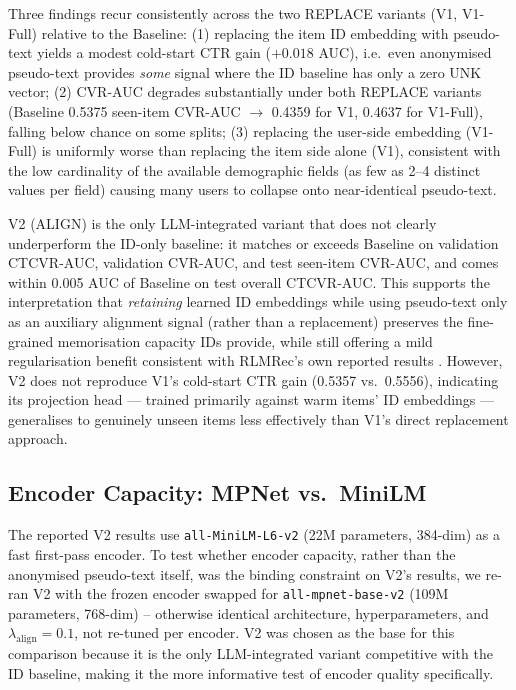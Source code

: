 Three findings recur consistently across the two REPLACE variants (V1, V1-Full) relative to the Baseline: (1) replacing the item ID embedding with pseudo-text yields a modest cold-start CTR gain ($+0.018$ AUC), i.e.\ even anonymised pseudo-text provides \emph{some} signal where the ID baseline has only a zero UNK vector; (2) CVR-AUC degrades substantially under both REPLACE variants (Baseline 0.5375 seen-item CVR-AUC $\to$ 0.4359 for V1, 0.4637 for V1-Full), falling below chance on some splits; (3) replacing the user-side embedding (V1-Full) is uniformly worse than replacing the item side alone (V1), consistent with the low cardinality of the available demographic fields (as few as 2--4 distinct values per field) causing many users to collapse onto near-identical pseudo-text.

V2 (ALIGN) is the only LLM-integrated variant that does not clearly underperform the ID-only baseline: it matches or exceeds Baseline on validation CTCVR-AUC, validation CVR-AUC, and test seen-item CVR-AUC, and comes within 0.005 AUC of Baseline on test overall CTCVR-AUC. This supports the interpretation that \emph{retaining} learned ID embeddings while using pseudo-text only as an auxiliary alignment signal (rather than a replacement) preserves the fine-grained memorisation capacity IDs provide, while still offering a mild regularisation benefit consistent with RLMRec's own reported results \cite{ren2024rlmrec}. However, V2 does not reproduce V1's cold-start CTR gain (0.5357 vs.\ 0.5556), indicating its projection head --- trained primarily against warm items' ID embeddings --- generalises to genuinely unseen items less effectively than V1's direct replacement approach.

\subsection{Encoder Capacity: MPNet vs.\ MiniLM}
\label{sec:mpnet}

The reported V2 results use \texttt{all-MiniLM-L6-v2} \cite{reimers2019sbert} (22M parameters, 384-dim) as a fast first-pass encoder. To test whether encoder capacity, rather than the anonymised pseudo-text itself, was the binding constraint on V2's results, we re-ran V2 with the frozen encoder swapped for \texttt{all-mpnet-base-v2} \cite{song2020mpnet} (109M parameters, 768-dim) -- otherwise identical architecture, hyperparameters, and $\lambda_{\text{align}}=0.1$, not re-tuned per encoder. V2 was chosen as the base for this comparison because it is the only LLM-integrated variant competitive with the ID baseline, making it the more informative test of encoder quality specifically.

